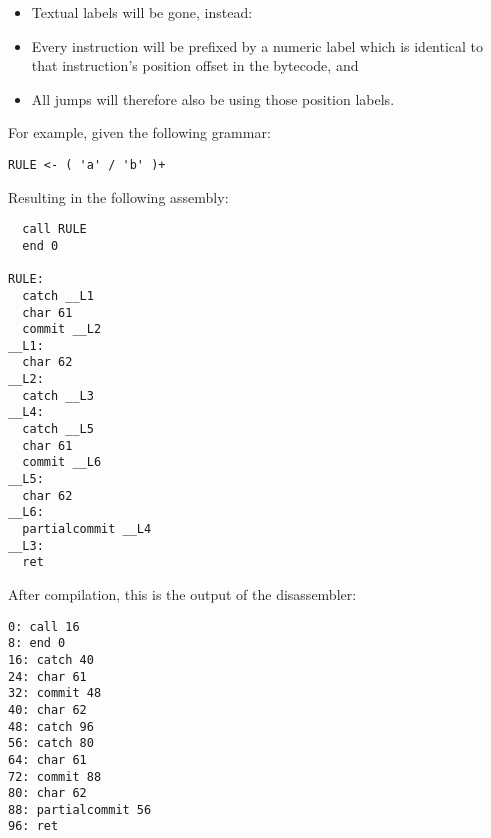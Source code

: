 \begin{itemize}
\item Textual labels will be gone, instead:
\item Every instruction will be prefixed by a numeric label which
      is identical to that instruction's position offset in the bytecode, and
\item All jumps will therefore also be using those position labels.
\end{itemize}

For example, given the following grammar:

\begin{myquote}
\begin{verbatim}
RULE <- ( 'a' / 'b' )+
\end{verbatim}
\end{myquote}

Resulting in the following assembly:

\begin{myquote}
\begin{verbatim}
  call RULE
  end 0

RULE:
  catch __L1
  char 61
  commit __L2
__L1:
  char 62
__L2:
  catch __L3
__L4:
  catch __L5
  char 61
  commit __L6
__L5:
  char 62
__L6:
  partialcommit __L4
__L3:
  ret
\end{verbatim}
\end{myquote}

After compilation, this is the output of the disassembler:

\begin{myquote}
\begin{verbatim}
0: call 16
8: end 0
16: catch 40
24: char 61
32: commit 48
40: char 62
48: catch 96
56: catch 80
64: char 61
72: commit 88
80: char 62
88: partialcommit 56
96: ret
\end{verbatim}
\end{myquote}

